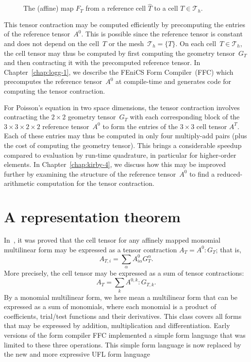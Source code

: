 \begin{figure}
\bwfig
\centering
  \caption{The (affine) map $F_T$ from a reference cell $\hat{T}$
    to a cell $T \in \mathcal{T}_h$.}
  \label{fig:affinemap}
\end{figure}

This tensor contraction may be computed efficiently by precomputing
the entries of the reference tensor~$A^0$. This is possible since the
reference tensor is constant and does not depend on the cell~$T$ or
the mesh~$\mathcal{T}_h = \{T\}$. On each cell~$T \in \mathcal{T}_h$,
the cell tensor may thus be computed by first computing the geometry
tensor~$G_T$ and then contracting it with the precomputed reference
tensor. In Chapter~\ref{chap:logg-1}, we describe the FEniCS Form
Compiler~(FFC) which precomputes the reference tensor~$A^0$ at
compile-time and generates code for computing the tensor contraction.

For Poisson's equation in two space dimensions, the tensor contraction
involves contracting the $2 \times 2$ geometry tensor~$G_T$ with each
corresponding block of the $3 \times 3 \times 2 \times 2$ reference
tensor~$A^0$ to form the entries of the $3 \times 3$ cell tensor
$A^T$. Each of these entries may thus be computed in only four
multiply-add pairs (plus the cost of computing the geometry
tensor). This brings a considerable speedup compared to evaluation by
run-time quadrature, in particular for higher-order elements. In
Chapter~\ref{chap:kirby-4}, we discuss how this may be improved
further by examining the structure of the reference tensor~$A^0$ to
find a reduced-arithmetic computation for the tensor contraction.

\section{A representation theorem}

In~\citet{KirbyLogg2006}, it was proved that the cell tensor for any
affinely mapped monomial multilinear form may be expressed as a tensor
contraction $A_T = A^0 : G_T$; that is,
\begin{equation}
  A_{T,i} = \sum_{\alpha} A^0_{i\alpha} G_T^{\alpha}.
\end{equation}
More precisely, the cell tensor may be expressed as a sum of tensor
contractions:
\begin{equation} \label{eq:tensorcontraction}
  A_T = \sum_k A^{0,k} : G_{T,k}.
\end{equation}
By a monomial multilinear form, we here mean a multilinear form that
can be expressed as a sum of monomials, where each monomial is a
product of coefficients, trial/test functions and their derivatives.
This class covers all forms that may be expressed by addition,
multiplication and differentiation. Early versions of the form
compiler FFC implemented a simple form language that was limited to
these three operations. This simple form language is now replaced by
the new and more expressive UFL form language

